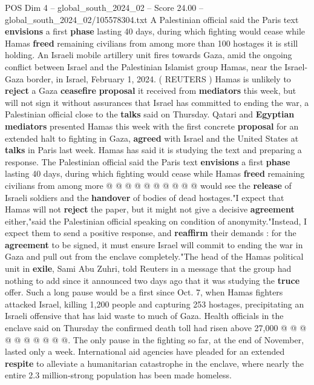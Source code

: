\begin{textsample}{POS Dim 4 – global\_south\_2024\_02 – Score 24.00 – global\_south\_2024\_02/105578304.txt}  \label{ex:f4_pos_074}
A Palestinian official said the Paris text \textbf{envisions} a first \textbf{phase} lasting 40 days, during which fighting would cease while Hamas \textbf{freed} remaining civilians from among more than 100 hostages it is still holding.
An Israeli mobile artillery unit fires towards Gaza, amid the ongoing conflict between Israel and the Palestinian Islamist group Hamas, near the Israel-Gaza border, in Israel, February 1, 2024. ( REUTERS ) Hamas is unlikely to \textbf{reject} a Gaza \textbf{ceasefire} \textbf{proposal} it received from \textbf{mediators} this week, but will not sign it without assurances that Israel has committed to ending the war, a Palestinian official close to the \textbf{talks} said on Thursday.
Qatari and \textbf{Egyptian} \textbf{mediators} presented Hamas this week with the first concrete \textbf{proposal} for an extended halt to fighting in Gaza, \textbf{agreed} with Israel and the United States at \textbf{talks} in Paris last week.
Hamas has said it is studying the text and preparing a response.
The Palestinian official said the Paris text \textbf{envisions} a first \textbf{phase} lasting 40 days, during which fighting would cease while Hamas \textbf{freed} remaining civilians from among more @ @ @ @ @ @ @ @ @ @ would see the \textbf{release} of Israeli soldiers and the \textbf{handover} of bodies of dead hostages."I expect that Hamas will not \textbf{reject} the paper, but it might not give a decisive \textbf{agreement} either,"said the Palestinian official speaking on condition of anonymity."Instead, I expect them to send a positive response, and \textbf{reaffirm} their demands : for the \textbf{agreement} to be signed, it must ensure Israel will commit to ending the war in Gaza and pull out from the enclave completely."The head of the Hamas political unit in \textbf{exile}, Sami Abu Zuhri, told Reuters in a message that the group had nothing to add since it announced two days ago that it was studying the \textbf{truce} offer.
Such a long pause would be a first since Oct. 7, when Hamas fighters attacked Israel, killing 1,200 people and capturing 253 hostages, precipitating an Israeli offensive that has laid waste to much of Gaza.
Health officials in the enclave said on Thursday the confirmed death toll had risen above 27,000 @ @ @ @ @ @ @ @ @ @.
The only pause in the fighting so far, at the end of November, lasted only a week.
International aid agencies have pleaded for an extended \textbf{respite} to alleviate a humanitarian catastrophe in the enclave, where nearly the entire 2.3 million-strong population has been made homeless.

\end{textsample}
